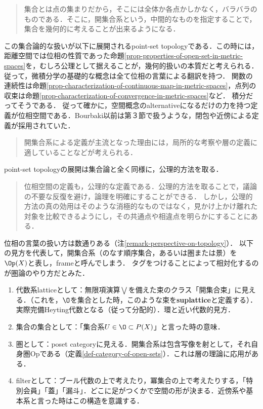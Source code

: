 \documentclass[uplatex,dvipdfmx]{jsreport}
\begin{document}
\begin{tcolorbox}[colframe=ForestGreen, colback=ForestGreen!10!white, breakable]
    \begin{quote}
        集合とは点の集まりだから，そこには全体か各点かしかなく，バラバラのものである．そこに，開集合系という，中間的なものを指定することで，集合を幾何的に考えることが出来るようになる．
    \end{quote}
    この集合論的な扱いが以下に展開されるpoint-set topologyである．この時には，距離空間では位相の性質であった命題\ref{prop-properties-of-open-set-in-metric-spaces}を，むしろ公理として据えることが，幾何的扱いの本質だと考えられる．
    従って，微積分学の基礎的な概念は全て位相の言葉による翻訳を持つ．
    関数の連続性は命題\ref{prop-characterization-of-continuous-map-in-metric-spaces}，点列の収束は命題\ref{prop-characterization-of-convergence-in-metric-spaces}など．
    積分だってそうである．
    従って確かに，空間概念のalternativeになるだけの力を持つ定義が位相空間である．Bourbaki以前は第３節で扱うような，閉包や近傍による定義が採用されていた．
    \begin{quote}
        開集合系による定義が主流となった理由には，局所的な考察や層の定義に適していることなどが考えられる．
    \end{quote}

    point-set topologyの展開は集合論と全く同様に，公理的方法を取る．
    \begin{quote}
        位相空間の定義も，公理的な定義である．公理的方法を取ることで，議論の不要な反復を避け，論理を明確にすることができる．
        しかし，公理的方法の真の効用はそのような消極的なものではなく，見かけ上かけ離れた対象を比較できるようにし，その共通点や相違点を明らかにすることにある．
    \end{quote}
    位相の言葉の扱い方は数通りある（注\ref{remark-perspective-on-topology}）．
    以下の見方を代表して，開集合系（のなす順序集合，あるいは圏または景）を$\Op(X)$と表し，frameと呼んでしまう．
    タグをつけることによって相対化するのが圏論のやり方だとみた．
    \begin{enumerate}
        \item 代数系latticeとして：無限項演算$\bigvee$を備えた束のクラス「開集合束」に見える．（これを，$\O$を集合とした時，このような束を\textbf{suplattice}と定義する）．実際完備Heyting代数となる（従って分配的）．環と近い代数的見方．
        \item 集合の集合として：「集合系$U\in\O\subset P(X)$」と言った時の意味．
        \item 圏として：poset categoryに見える．開集合系は包含写像を射として，それ自身圏Opである（定義\ref{def-category-of-open-sets}）．これは層の理論に応用がある．
        \item filterとして：ブール代数の上で考えたり，冪集合の上で考えたりする，「特別会員」「蓋」「漏斗」．どこに足がつくかで空間の形が決まる．近傍系や基本系と言った時はこの構造を意識する．
    \end{enumerate}
\end{tcolorbox}
\end{document}
